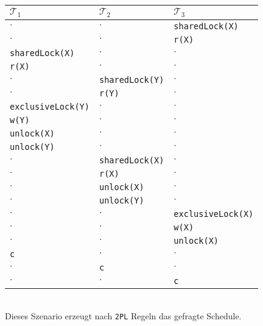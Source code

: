 \documentclass{uni_tue_template}
\newcommand{\code}[1]{\texttt{{\footnotesize #1}}}
\begin{document}
\exercise{}\\
  \begin{tabular}{l|l|l}
  $\mathcal{T}_1$&$\mathcal{T}_2$&$\mathcal{T}_3$\\
  \hline
  $\cdot$&$\cdot$&\code{sharedLock(X)}\\
  $\cdot$&$\cdot$&\code{r(X)}\\
  \code{sharedLock(X)}&$\cdot$&$\cdot$\\
  \code{r(X)}&$\cdot$&$\cdot$\\
  $\cdot$&\code{sharedLock(Y)}&$\cdot$\\
  $\cdot$&\code{r(Y)}&$\cdot$\\
  \code{exclusiveLock(Y)}&$\cdot$&$\cdot$\\
  \code{w(Y)}&$\cdot$&$\cdot$\\
  \code{unlock(X)}&$\cdot$&$\cdot$\\
  \code{unlock(Y)}&$\cdot$&$\cdot$\\
  $\cdot$&\code{sharedLock(X)}&$\cdot$\\
  $\cdot$&\code{r(X)}&$\cdot$\\
  $\cdot$&\code{unlock(X)}&$\cdot$\\
  $\cdot$&\code{unlock(Y)}&$\cdot$\\
  $\cdot$&$\cdot$&\code{exclusiveLock(X)}\\
  $\cdot$&$\cdot$&\code{w(X)}\\
  $\cdot$&$\cdot$&\code{unlock(X)}\\
  \code{c}&$\cdot$&$\cdot$\\
  $\cdot$&\code{c}&$\cdot$\\
  $\cdot$&$\cdot$&\code{c}
  \end{tabular}\\
  Dieses Szenario erzeugt nach \code{2PL} Regeln das gefragte Schedule.
%
\newpage
%
\exercise{}\\
  \item \hfill\\
\end{document}
